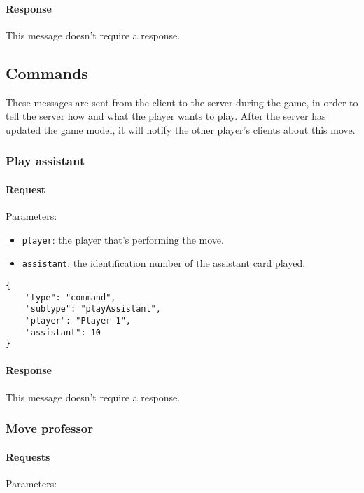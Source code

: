 \documentclass[a4paper]{article}
\begin{document}
	\paragraph{Response} This message doesn't require a response.

	\subsection{Commands}

	These messages are sent from the client to the server during the game, in order to tell the server how and what the player wants to play. After the server has updated the game model, it will notify the other player's clients about this move.

	\subsubsection{Play assistant}

	\paragraph{Request} Parameters:

	\begin{itemize}
		\item \verb|player|: the player that's performing the move.
		\item \verb|assistant|: the identification number of the assistant card played.
	\end{itemize}

	\begin{verbatim}
{
	"type": "command",
	"subtype": "playAssistant",
	"player": "Player 1",
	"assistant": 10
}
	\end{verbatim}

	\paragraph{Response} This message doesn't require a response.

	\subsubsection{Move professor}

	\paragraph{Requests} Parameters:
\end{document}
